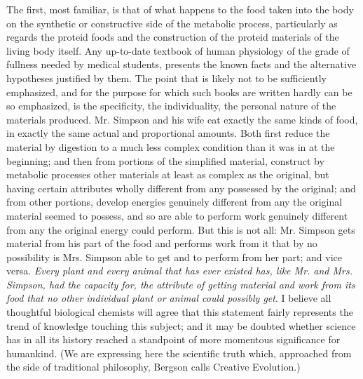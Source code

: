 \documentclass[a4paper, 11pt, oneside, polutonikogreek, english, landscape]{article}
\begin{document}
The first, most familiar, is that of what happens to the food taken into the body on the synthetic or constructive side of the metabolic process, particularly as regards the proteid foods and the construction of the proteid materials of the living body itself. Any up-to-date textbook of human physiology of the grade of fullness needed by medical students, presents the known facts and the alternative hypotheses justified by them. The point that is likely not to be sufficiently emphasized, and for the purpose for which such books are written hardly can be so emphasized, is the specificity, the individuality, the personal nature of the materials produced. Mr. Simpson and his wife eat exactly the same kinds of food, in exactly the same actual and proportional amounts. Both first reduce the material by digestion to a much less complex condition than it was in at the beginning; and then from portions of the simplified material, construct by metabolic processes other materials at least as complex as the original, but having certain attributes wholly different from any possessed by the original; and from other portions, develop energies genuinely different from any the original material seemed to possess, and so are able to perform work genuinely different from any the original energy could perform. But this is not all: Mr. Simpson gets material from his part of the food and performs work from it that by no possibility is Mrs. Simpson able to get and to perform from her part; and vice versa. \emph{Every plant and every animal that has ever existed has, like Mr. and Mrs. Simpson, had the capacity for, the attribute of getting material and work from its food that no other individual plant or animal could possibly get}. I believe all thoughtful biological chemists will agree that this statement fairly represents the trend of knowledge touching this subject; and it may be doubted whether science has in all its history reached a standpoint of more momentous significance for humankind. (We are expressing here the scientific truth which, approached from the side of traditional philosophy, Bergson calls Creative Evolution.)
\end{document}
